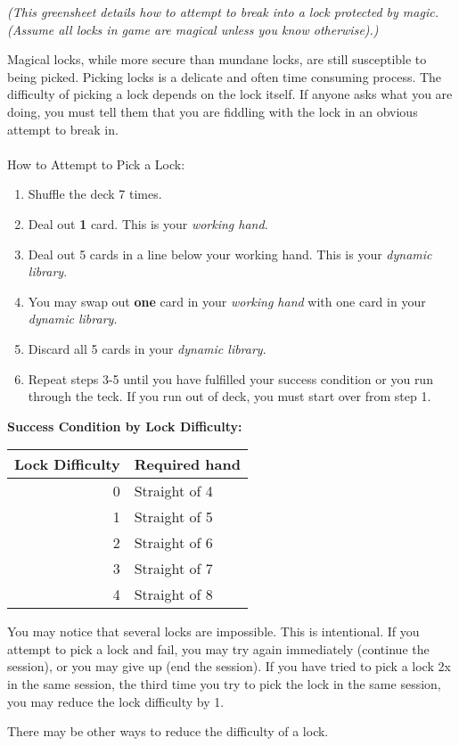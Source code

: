 \documentclass[green]{NeptuneBall}
\begin{document}
\name{\gDecking{}}

\emph{(This greensheet details how to attempt to break into a lock protected by magic. (Assume all locks in game are magical unless you know otherwise).)}

Magical locks, while more secure than mundane locks, are still susceptible to being picked. Picking locks is a delicate and often time consuming process. The difficulty of picking a lock depends on the lock itself. If anyone asks what you are doing, you must tell them that you are fiddling with the lock in an obvious attempt to break in.\\ \\

How to Attempt to Pick a Lock:
\begin{enumerate}
	\item Shuffle the deck 7 times.
	\item Deal out {\bf 1} card. This is your {\em working hand}.
	\item Deal out 5 cards in a line below your working hand. This is your {\em dynamic library}.
	\item You may swap out {\bf one} card in your {\em working hand} with one card in your {\em dynamic library}.
	\item Discard all 5 cards in your {\em dynamic library}.
	\item Repeat steps 3-5 until you have fulfilled your success condition or you run through the teck.  If you run out of deck, you must start over from step 1.
\end{enumerate}

{\bf Success Condition by Lock Difficulty:}\\
\begin{tabular}{||r|l||}
\hline\hline
Lock Difficulty	& Required hand\\
\hline
0	& Straight of 4\\
1	& Straight of 5\\
2	& Straight of 6\\
3	& Straight of 7\\
4	& Straight of 8\\
\hline\hline 
\end{tabular}

\vspace{10 mm}

You may notice that several locks are impossible. This is intentional. If you attempt to pick a lock and fail, you may try again immediately (continue the session), or you may give up (end the session). If you have tried to pick a lock 2x in the same session, the third time you try to pick the lock in the same session, you may reduce the lock difficulty by 1.

There may be other ways to reduce the difficulty of a lock.
\end{document}
